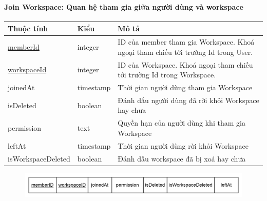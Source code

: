 \paragraph{Join Workspace: Quan hệ tham gia giữa người dùng và workspace}
\begin{center}
\begin{tabular}{ |p{3cm} |p{2cm} |p{9cm} |} 
 \hline
    Thuộc tính & Kiểu & Mô tả \\ [0.5ex] 
 \hline
 \underline{memberId} & integer & ID của member tham gia Workspace. Khoá ngoại tham chiếu tới trường Id trong User. \\ 
 \hline
 \underline{workspaceId} & integer & ID của Workspace. Khoá ngoại tham chiếu tới trường Id trong Workspace. \\
 \hline
 joinedAt & timestamp & Thời gian người dùng tham gia Workspace \\
 \hline
 isDeleted & boolean & Đánh dấu người dùng đã rời khỏi Workspace hay chưa \\
 \hline
 permission & text & Quyền hạn của người dùng khi tham gia Workspace \\
 \hline
 leftAt & timestamp & Thời gian người dùng rời khỏi Workspace \\
 \hline
 isWorkspaceDeleted & boolean & Đánh dấu workspace đã bị xoá hay chưa \\
 \hline
\end{tabular}
\end{center}
\begin{figure}[h]
        \centering
        \includegraphics[width=\textwidth]{Content/Phân tích và thiết kế hệ thống/images/ERD_mapping/joinWorkspace_mapping.png}
        \label{fig:enter-label}
\end{figure}

